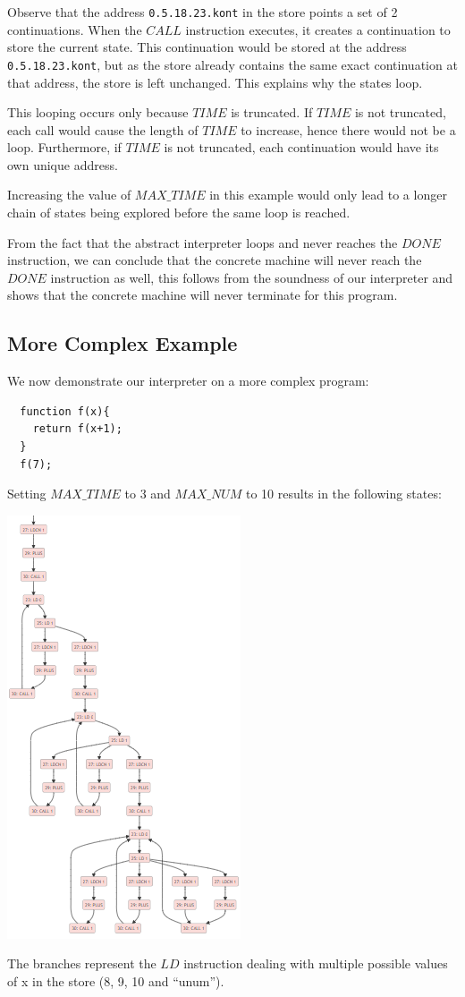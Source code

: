 \documentclass[12pt]{article}
\begin{document}
Observe that the address \verb|0.5.18.23.kont| in the store points a set of 2 continuations. When the $CALL$ instruction executes, it creates a continuation to store the current state. This continuation would be stored at the address \verb|0.5.18.23.kont|, but as the store already contains the same exact continuation at that address, the store is left unchanged. This explains why the states loop.

This looping occurs only because $TIME$ is truncated. If $TIME$ is not truncated, each call would cause the length of $TIME$ to increase, hence there would not be a loop. Furthermore, if $TIME$ is not truncated, each continuation would have its own unique address.

Increasing the value of $MAX\_TIME$ in this example would only lead to a longer chain of states being explored before the same loop is reached.

From the fact that the abstract interpreter loops and never reaches the $DONE$ instruction, we can conclude that the concrete machine will never reach the $DONE$ instruction as well, this follows from the soundness of our interpreter and shows that the concrete machine will never terminate for this program.

\subsection{More Complex Example}
We now demonstrate our interpreter on a more complex program:
\begin{verbatim}
  function f(x){
    return f(x+1);
  }
  f(7);
\end{verbatim}
Setting $MAX\_TIME$ to 3 and $MAX\_NUM$ to 10 results in the following states:
\begin{center}
  \includegraphics[scale=0.7]{complex_graph.png}
\end{center}
The branches represent the $LD$ instruction dealing with multiple possible values of x in the store (8, 9, 10 and ``unum'').
\end{document}
